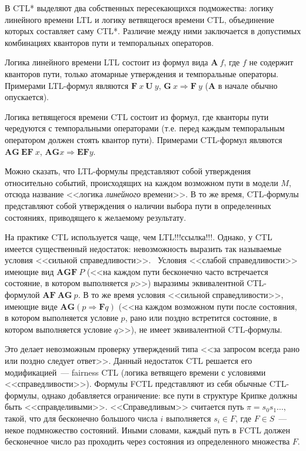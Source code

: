 \documentclass[a4paper,notitlepage,14pt]{article}
\begin{document}
В CTL* выделяют два собственных пересекающихся подможества: логику линейного времени LTL и
логику ветвящегося времени CTL, объединение которых составляет саму CTL*. Различие между
ними заключается в допустимых комбинациях кванторов пути и темпоральных операторов. 

Логика линейного времени LTL состоит из формул вида $\mathbf{A}~f$, где $f$ не содержит
кванторов пути, только атомарные утверждения и темпоральные операторы. Примерами
LTL-формул являются $\mathbf{F}~x~\mathbf{U}~y$, $\mathbf{G}~x \Rightarrow \mathbf{F}~y$
($\mathbf{A}$ в начале обычно опускается).

Логика ветвящегося времени CTL состоит из формул, где кванторы пути чередуются с
темпоральными операторами (т.е. перед каждым темпоральным оператором должен стоять квантор
пути). Примерами CTL-формул являются $\mathbf{AG}~\mathbf{EF}~x$, $\mathbf{AG} x
\Rightarrow \mathbf{EF} y$.

Можно сказать, что LTL-формулы представляют собой утверждения относительно событий,
происходящих на каждом возможном пути в модели $M$, отсюда название <<логика
\emph{линейного} времени>>. В то же время, CTL-формулы представляют собой утверждения о
наличии выбора пути в определенных состояниях, приводящего к желаемому
результату.~\cite{Clarke}

На практике CTL используется чаще, чем LTL!!!ссылка!!!. Однако, у CTL имеется существенный
недостаток: невозможность выразить так называемые условия <<сильной
справедливости>>.~\cite{Katoen,DBLP:conf/spin/FaragoS09} Условия <<слабой справедливости>>
имеющие вид $\mathbf{AGF}~P$ (<<на каждом пути бесконечно часто встречается состояние, в
котором выполняется $p$>>) выразимы эквивалентной CTL-формулой $\mathbf{AF~AG}~p$. В то же
время условия <<сильной справедливости>>, имеющие виде $\mathbf{AG} (p \Rightarrow
\mathbf{F} q)$ (<<на каждом возможном пути после состояния, в котором выполняется условие
$p$, рано или поздно встретится состояние, в котором выполняется условие $q$>>), не имеет
эквивалентной CTL-формулы.

Это делает невозможным проверку утверждений типа <<за запросом всегда рано или поздно
следует ответ>>. Данный недостаток CTL решается его модификацией~--- fairness CTL (логика
ветвящего времени с условиями <<справедливости>>). Формулы FCTL представляют из себя
обычные CTL-формулы, однако добавляется ограничение: все пути в структуре Крипке должны
быть <<справделивыми>>. <<Справедливым>> считается путь $\pi = s_0s_1\ldots$, такой, что
для бесконечно большого числа $i$ выполняется $s_i \in F$, где $F \in S$~--- некое
подмножество состояний. Иными словами, каждый путь в FCTL должен бесконечное число раз
проходить через состояния из определенного множества $F$.
\end{document}
